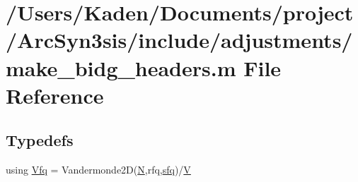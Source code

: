 \hypertarget{a01014}{}\section{/\+Users/\+Kaden/\+Documents/project/\+Arc\+Syn3sis/include/adjustments/make\+\_\+bidg\+\_\+headers.m File Reference}
\label{a01014}
\subsection*{Typedefs}
\begin{DoxyCompactItemize}
\item 
using \hyperlink{a01014_ad06233c3cbd809b83fb292471e66fc78}{Vfq} = Vandermonde2D(\hyperlink{a00473_a5b9c4563028063ee53b517cce9aa701b}{N},rfq,\hyperlink{a00473_af5555ce3d578203ae1f6d0731e4f1170}{sfq})/\hyperlink{a00575_af658e24e5ad7935911c432c5c02d895c}{V}
\end{DoxyCompactItemize}
